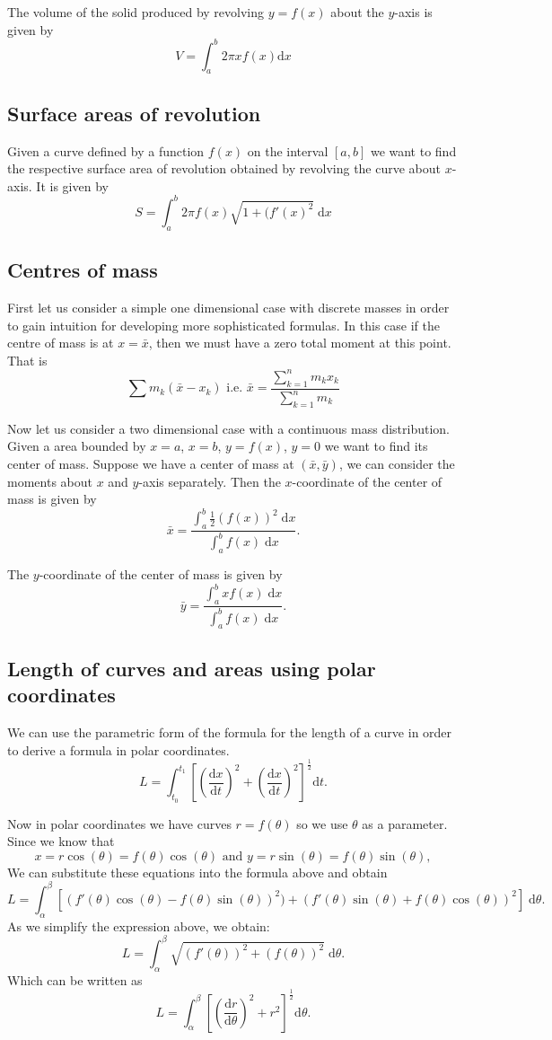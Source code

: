 \documentclass[11pt,a4paper]{article}
\newcommand\dee{\text{d}}
\theoremstyle{definition}
\begin{document}
The volume of the solid produced by revolving $ y = f(x) $ about the $y$-axis is given by
\[ V = \int_a^b 2\pi x f(x) \dee x \]

\subsection{Surface areas of revolution}

Given a curve defined by a function $ f(x) $ on the interval $ [a, b] $ we want to find the respective surface area of revolution obtained by revolving the curve about $x$-axis.
It is given by
\[ S = \int_a^b 2\pi f(x) \sqrt{1 + (f'(x)^2} \; \dee x\]

\subsection{Centres of mass}

First let us consider a simple one dimensional case with discrete masses in order to gain intuition for developing more sophisticated formulas.
In this case if the centre of mass is at $ x = \bar x $, then we must have a zero total moment at this point. That is 
\[ \sum m_k (\bar x - x_k) \text{ i.e. } \bar x = \dfrac{\sum_{k = 1}^n m_k x_k}{\sum_{k = 1}^n m_k}\]

Now let us consider a two dimensional case with a continuous mass distribution.
Given a area bounded by $ x = a $, $ x = b $, $ y = f(x) $, $ y = 0 $ we want to find its center of mass. 
Suppose we have a center of mass at $ (\bar x, \bar y) $, we can consider the moments about $x$ and $y$-axis separately. 
Then the $x$-coordinate of the center of mass is given by
\[ \bar x = \dfrac{\int_a^b \frac{1}{2} (f(x))^2 \; \dee x}{\int_a^b f(x) \; \dee x}.\]

The $y$-coordinate of the center of mass is given by
\[ \bar y = \dfrac{\int_a^b xf(x) \; \dee x}{\int_a^b f(x) \; \dee x}.\]

\subsection{Length of curves and areas using polar coordinates}
We can use the parametric form of the formula for the length of a curve in order to derive a formula in polar coordinates.
\[ L = \int_{t_0}^{t_1} \left[\left(\frac{\dee x}{\dee t}\right)^2 + \left(\frac{\dee x}{\dee t}\right)^2 \right]^{\frac{1}{2}}\dee t.\]

Now in polar coordinates we have curves $ r = f(\theta) $ so we use $ \theta $ as a parameter. Since we know that 
\[ x = r \cos(\theta) = f(\theta) \cos(\theta) \text{ and } y = r \sin(\theta) = f(\theta) \sin(\theta),\]
We can substitute these equations into the formula above and obtain
\[ L = \int_\alpha^\beta \left[(f'(\theta)\cos(\theta) - f(\theta)\sin(\theta))^2) + (f'(\theta)\sin(\theta) + f(\theta)\cos(\theta))^2\right] \; \dee \theta.\]
As we simplify the expression above, we obtain:
\[ L = \int_\alpha^\beta \sqrt{(f'(\theta))^2 + (f(\theta))^2} \; \dee \theta.\]
Which can be written as 
\[ L = \int_\alpha^\beta \left[\left(\frac{\dee r}{\dee \theta}\right)^2 + r^2\right]^{\frac{1}{2}} \dee \theta. \]
\end{document}
